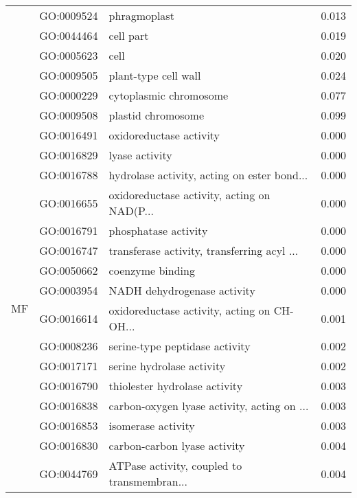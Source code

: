 \begin{longtable}{lllr}
   & GO:0009524 &                                 phragmoplast &         0.013 \\
   & GO:0044464 &                                    cell part &         0.019 \\
   & GO:0005623 &                                         cell &         0.020 \\
   & GO:0009505 &                         plant-type cell wall &         0.024 \\
   & GO:0000229 &                       cytoplasmic chromosome &         0.077 \\
   & GO:0009508 &                           plastid chromosome &         0.099 \\
\cline{1-4}
\multirow{99}{*}{MF} & GO:0016491 &                      oxidoreductase activity &         0.000 \\
   & GO:0016829 &                               lyase activity &         0.000 \\
   & GO:0016788 &  hydrolase activity, acting on ester bond... &         0.000 \\
   & GO:0016655 &  oxidoreductase activity, acting on NAD(P... &         0.000 \\
   & GO:0016791 &                         phosphatase activity &         0.000 \\
   & GO:0016747 &  transferase activity, transferring acyl ... &         0.000 \\
   & GO:0050662 &                             coenzyme binding &         0.000 \\
   & GO:0003954 &                  NADH dehydrogenase activity &         0.000 \\
   & GO:0016614 &  oxidoreductase activity, acting on CH-OH... &         0.001 \\
   & GO:0008236 &               serine-type peptidase activity &         0.002 \\
   & GO:0017171 &                    serine hydrolase activity &         0.002 \\
   & GO:0016790 &                thiolester hydrolase activity &         0.003 \\
   & GO:0016838 &  carbon-oxygen lyase activity, acting on ... &         0.003 \\
   & GO:0016853 &                           isomerase activity &         0.003 \\
   & GO:0016830 &                 carbon-carbon lyase activity &         0.004 \\
   & GO:0044769 &  ATPase activity, coupled to transmembran... &         0.004 \\

\end{longtable}
